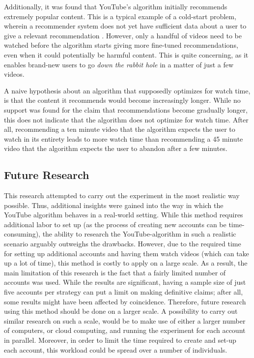 \documentclass[../main.tex]{subfiles}
\begin{document}
Additionally, it was found that YouTube's algorithm initially recommends extremely popular content. This is a typical
example of a cold-start problem, wherein a recommender system does not yet have sufficient data about a user to give a
relevant recommendation \citep{lam2008addressing}. However, only a handful of videos need to be watched before the
algorithm starts giving more fine-tuned recommendations, even when it could potentially be harmful content. This
is quite concerning, as it enables brand-new users to go \textit{down the rabbit hole} in a matter of just a few videos.

A naive hypothesis about an algorithm that supposedly optimizes for watch time, is that the content it recommends would
become increasingly longer. While no support was found for the claim that recommendations become gradually longer, this
does not indicate that the algorithm does not optimize for watch time. After all, recommending a ten minute video that
the algorithm expects the user to watch in its entirety leads to more watch time than recommending a 45 minute video
that the algorithm expects the user to abandon after a few minutes. 

\subsection{Future Research}
This research attempted to carry out the experiment in the most realistic way possible. Thus, additional insights were 
gained into the way in which the YouTube algorithm behaves in a real-world setting. While this method requires 
additional labor to set up (as the process of creating new accounts can be time-consuming), the ability to research the
YouTube-algorithm in such a realistic scenario arguably outweighs the drawbacks. However, due to the required time for
setting up additional accounts and having them watch videos (which can take up a lot of time), this method is costly to
apply on a large scale. As a result, the main limitation of this research is the fact that a fairly limited number of
accounts was used. While the results are significant, having a sample size of just five accounts per strategy can put
a limit on making definitive claims; after all, some results might have been affected by coincidence. Therefore, future
research using this method should be done on a larger scale. A possibility to carry out similar research on such a
scale, would be to make use of either a larger number of computers, or cloud computing, and running the experiment for
each account in parallel. Moreover, in order to limit the time required to create and set-up each account, this workload
could be spread over a number of individuals. 
\end{document}

